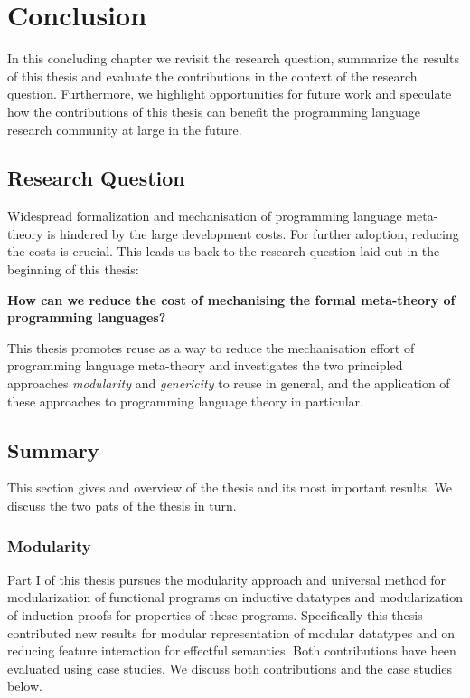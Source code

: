 \chapter{Conclusion}

In this concluding chapter we revisit the research question, summarize the
results of this thesis and evaluate the contributions in the context of the
research question. Furthermore, we highlight opportunities for future work and
speculate how the contributions of this thesis can benefit the programming
language research community at large in the future.

\section{Research Question}
Widespread formalization and mechanisation of programming language meta-theory
is hindered by the large development costs. For further adoption, reducing the
costs is crucial. This leads us back to the research question laid out in the
beginning of this thesis:

\begin{center}
  \begin{minipage}{0.8\columnwidth}\bf
    How can we reduce the cost of mechanising the formal meta-theory of
    programming languages?
  \end{minipage}
\end{center}

This thesis promotes reuse as a way to reduce the mechanisation effort of
programming language meta-theory and investigates the two principled approaches
\emph{modularity} and \emph{genericity} to reuse in general, and the application
of these approaches to programming language theory in particular.

\section{Summary}

This section gives and overview of the thesis and its most important results. We
discuss the two pats of the thesis in turn.

\subsection{Modularity}
Part I of this thesis pursues the modularity approach and universal method for
modularization of functional programs on inductive datatypes and modularization
of induction proofs for properties of these programs. Specifically this thesis
contributed new results for modular representation of modular datatypes and on
reducing feature interaction for effectful semantics. Both contributions have
been evaluated using case studies. We discuss both contributions and the case
studies below.

